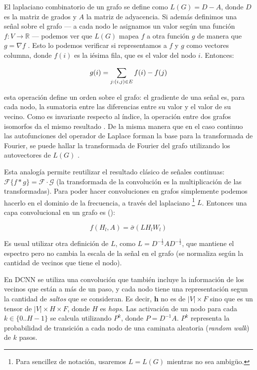 \documentclass[
    left=2.0cm,         %
    right=2.0cm,        %
    top=2.0cm,          %
    bottom=2.5cm,         %
    bindingoffset=6mm,  %
    nohyphenation=false %
]{eiti/eiti-thesis}
\begin{document}
El laplaciano combinatorio de un grafo se define como $L(G) = D-A$, donde $D$ es la matriz
de grados y $A$ la matriz de adyacencia. Si además definimos una señal sobre el grafo ---
a cada nodo le asignamos un valor según una función $f: V \rightarrow \mathbb{R}$ ---
podemos ver que $L(G)$ mapea $f$ a otra función $g$ de manera que $g = \nabla f$ \cite{whatsuplaplacian}.
Esto lo podemos %
verificar si representamos a $f$ y $g$ como vectores columna, donde $f(i)$ es la iésima fila,%
que es el valor del nodo $i$. Entonces: 

\begin{equation*}
\Large
g(i) = \sum_{j:(i,j) \in E} f(i)-f(j)    
\end{equation*}


esta operación define un orden sobre el grafo: el gradiente de una señal es,
para cada nodo, la sumatoria entre las diferencias entre su valor y el valor de
su vecino. Como es invariante respecto al índice, la operación entre dos grafos
isomorfos da el mismo resultado \cite{atwood2016dcnn}.
De la misma manera que en el caso continuo las autofunciones del operador
de Laplace forman la base para la transformada de Fourier, se puede hallar la transformada
de Fourier del grafo utilizando los autovectores de $L(G)$ \cite{graphfourier}. 

Esta analogía permite reutilizar el resultado clásico de señales continuas: 
$\mathcal{F}\{f*g\} = \mathcal{F}\cdot \mathcal{G}$ (la transformada de la convolución es la
multiplicación de las transformadas). Para poder hacer
convoluciones en grafos simplemente podemos hacerlo en el dominio de la
frecuencia, a través del laplaciano \footnote{Para sencillez de notación, usaremos
$L = L(G)$ mientras no sea ambigüo.} $L$. Entonces una capa convolucional
en un grafo es (\cite{kipf2016gcn}): 

$$f(H_l, A) = \bar \sigma (L H_l W_l)$$


Es usual utilizar otra definición de $L$, como $L = D^{-\frac{1}{2}} A D^{-\frac{1}{2}}$,
que mantiene el espectro pero no cambia la escala de la señal en el grafo (se normaliza
según la cantidad de vecinos que tiene el nodo).

En DCNN \cite{atwood2016dcnn} se utiliza una convolución que también incluye
la información de los vecinos que están a más de un paso, y cada nodo
tiene una representación segun la cantidad de \textit{saltos} que se consideran.
Es decir, $\mathbf h$ no es de $|V| \times F$ sino que es un tensor de $|V|\times H \times F$,
donde $H$ es \textit{hops}. Las activación de un nodo para cada $k\in \{0..H-1\}$  se
calcula utilizando $P^k$, donde $P = D^{-1}A$. $P^k$ representa la probabilidad de
transición a cada nodo de una caminata aleatoria (\textit{random walk}) de $k$ pasos.
\end{document}
